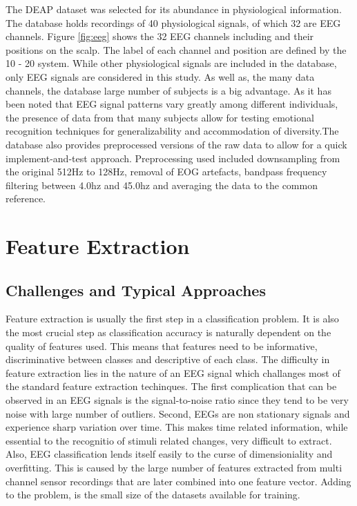 \documentclass[12pt, a4paper, fleqn]{memoir}%
\begin{document}
The DEAP dataset was selected for its abundance in physiological information. The database holds recordings of 40 physiological signals, of which 32 are EEG channels. Figure \ref{fig:eeg} shows the 32 EEG channels including and their positions on the scalp. The label of each channel and position are defined by the 10 - 20 system. While other physiological signals are included in the database, only EEG signals are considered in this study. As well as, the many data channels, the database large number of subjects is a big advantage. As it has been noted that EEG signal patterns vary greatly among different individuals, the presence of data from that many subjects allow for testing emotional recognition techniques for generalizability and accommodation of diversity.The database also provides preprocessed versions of the raw data to allow for a quick implement-and-test approach. Preprocessing used included downsampling from the original 512Hz to 128Hz, removal of EOG artefacts, bandpass frequency filtering between 4.0hz and 45.0hz and averaging the data to the common reference.

\chapter{Feature Extraction}
\label{chap:FeatureExtraction}

\section{Challenges and Typical Approaches}
\label{sec:CommonMethods}
Feature extraction is usually the first step in a classification problem. It is also the most crucial step as classification accuracy is naturally dependent on the quality of features used. This means that features need to be informative, discriminative between classes and descriptive of each class. The difficulty in feature extraction lies in the nature of an EEG signal which challanges most of the standard feature extraction techinques. The first complication that can be observed in an EEG signals is the signal-to-noise ratio since they tend to be very noise with large number of outliers. Second, EEGs are non stationary signals and experience sharp variation over time. This makes time related information, while essential to the recognitio of stimuli related changes, very difficult to extract. Also, EEG classification lends itself easily to the curse of dimensioniality and overfitting. This is caused by the large number of features extracted from multi channel sensor recordings that are later combined into one feature vector. Adding to the problem, is the small size of the datasets available for training\cite{lotte2007review}.
\end{document}
